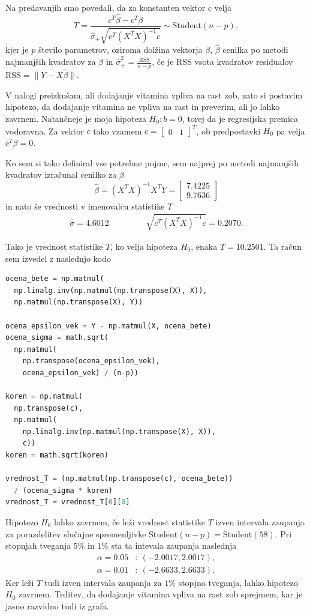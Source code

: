 \documentclass[12pt, a4paper]{article}
\begin{document}
Na predavanjih smo povedali, da za konstanten vektor $c$ velja 
\[
T = 
\frac{c^T \widehat{\beta} - c^T \beta}{\widehat{\sigma}_+ \sqrt{c^T(X^T X )^{-1}c}}
\sim \text{Student}(n-p),
\]
kjer je $p$ število parametrov, oziroma dolžina vektorja $\beta$, $\widehat{\beta}$ cenilka po metodi najmanjših kvadratov za $\beta$ in $\widehat{\sigma}^2_+ = \frac{\text{RSS}}{n-p}$, če je RSS vsota kvadratov residualov $\text{RSS}= \lVert Y - X \widehat{\beta} \rVert $.

V nalogi preizkušam, ali dodajanje vitamina vpliva na rast zob, zato si postavim hipotezo, da dodajanje vitamina ne vpliva na rast in preverim, ali jo lahko zavrnem. Natančneje je moja hipoteza $H_0: b = 0$, torej da je regresijska premica vodoravna. Za vektor $c$ tako vzamem $c =  \begin{bmatrix} 0 & 1 \end{bmatrix}^T$, ob predpostavki $H_0$ pa velja $c^T \beta = 0$.

Ko sem si tako definiral vse potrebne pojme, sem najprej po metodi najmanjših kvadratov izračunal cenilko za $\beta$
\[
\widehat{\beta} = \left(X^T X\right)^{-1}X^T Y =
\begin{bmatrix} 7.4225 \\ 9.7636 \end{bmatrix}
\]
in nato še vrednosti v imenovalcu statistike $T$
\begin{align*}
\widehat{\sigma} = 4.6012 & \quad & \quad &
\sqrt{c^T(X^T X )^{-1}c} = 0.2070.
\end{align*}

Tako je vrednost statistike $T$, ko velja hipoteza $H_0$, enaka $T = 10.2501$. Ta račun sem izvedel z naslednjo kodo

\begin{lstlisting}[language=Python]
ocena_bete = np.matmul(
  np.linalg.inv(np.matmul(np.transpose(X), X)), 
  np.matmul(np.transpose(X), Y))

ocena_epsilon_vek = Y - np.matmul(X, ocena_bete)
ocena_sigma = math.sqrt(
  np.matmul(
    np.transpose(ocena_epsilon_vek), 
    ocena_epsilon_vek) / (n-p))

koren = np.matmul(
  np.transpose(c), 
  np.matmul(
    np.linalg.inv(np.matmul(np.transpose(X), X)), 
    c))
koren = math.sqrt(koren)

vrednost_T = (np.matmul(np.transpose(c), ocena_bete)) 
  / (ocena_sigma * koren)
vrednost_T = vrednost_T[0][0]
\end{lstlisting}

Hipotezo $H_0$ lahko zavrnem, če leži vrednost statistike $T$ izven intervala zaupanja za porazdelitev slučajne spremenljivke $\text{Student}(n-p) = \text{Student}(58)$. Pri stopnjah tveganja $5\%$ in $1\%$ sta ta intevala zaupanja naslednja
\begin{align*}
\alpha = 0.05 &: \ (- 2.0017, 2.0017), \\
\alpha = 0.01 &: \ (-2.6633, 2.6633).
\end{align*}
Ker leži $T$ tudi izven intervala zaupanja za $1\%$ stopjno tveganja, lahko hipotezo $H_0$ zavrnem. Trditev, da dodajanje vitamina vpliva na rast zob sprejmem, kar je jasno razvidno tudi iz grafa.
\end{document}
